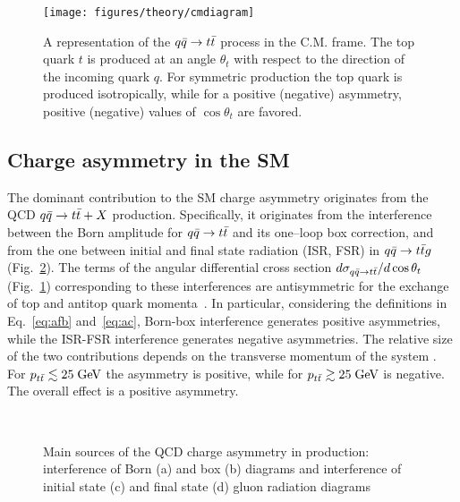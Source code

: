 \begin{figure}[!htb]\centering
  \texttt{[image: figures/theory/cmdiagram]}
  \caption{A representation of the $q\bar{q}{}\to t\bar{t}{}$ process in the
    C.M. frame. The top quark $t$ is produced at an angle $\theta_t$
    with respect to the direction of the incoming quark $q$. For
    symmetric production the top quark is produced isotropically,
    while for a positive (negative) asymmetry, positive (negative)
    values of $\cos\theta_t$ are favored. } 
  \label{fig:cmdiagram}
\end{figure}


\subsection{Charge asymmetry in the SM}
\label{sec:smca}

The dominant contribution to the SM charge asymmetry originates from
the QCD $q\bar{q}{}\to t\bar{t}{}+X$ production. Specifically, it originates from the
interference between the Born amplitude for $q\bar{q}{}\to t\bar{t}{}$ and
its one--loop box correction, and from the one between initial and final
state radiation (ISR, FSR) in $q\bar{q}{}\to{}t\bar{t}{}g$
(Fig.~\ref{fig:asymdiagrams}). The terms of the angular differential cross section
$d\sigma_{q\bar{q}{}\to{}t\bar{t}{}}/d\cos\theta_t$ (Fig.~\ref{fig:cmdiagram})
corresponding to these interferences are antisymmetric for the
exchange of top and antitop quark momenta~\cite{Kuhn:1998kw}. In
particular, considering the definitions in Eq.~\ref{eq:afb}
and~\ref{eq:ac}, Born-box interference generates positive asymmetries,
while the ISR-FSR interference generates negative asymmetries.
The relative size of the two contributions depends on the transverse
momentum of the \ttbar{} system \pttt{}. For
$p_{t\bar{t}}{}\lesssim{}25\; \mathrm{GeV}{}$ the asymmetry is positive, while for
$p_{t\bar{t}}{}\gtrsim{}25\; \mathrm{GeV}{}$ is negative. The overall effect is a
positive asymmetry.
\begin{figure}[!htb]
  \centering
   \quad
   \\
   \quad
  \caption{Main sources of the QCD charge asymmetry in \ttbar{}
    production: interference of Born (a) and box (b) diagrams and
    interference of initial state (c) and final state (d) gluon
    radiation diagrams}
  \label{fig:asymdiagrams}
\end{figure}

